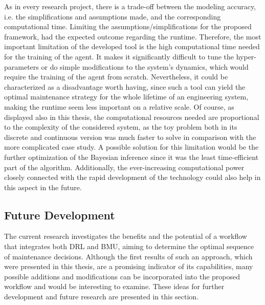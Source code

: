 As in every research project, there is a trade-off between the modeling accuracy, i.e. the simplifications and assumptions made, and the corresponding computational time. Limiting the assumptions/simplifications for the proposed framework, had the expected outcome regarding the runtime. Therefore, the most important limitation of the developed tool is the high computational time needed for the training of the agent. It makes it significantly difficult to tune the hyper-parameters or do simple modifications to the system's dynamics, which would require the training of the agent from scratch. Nevertheless, it could be characterized as a disadvantage worth having, since such a tool can yield the optimal maintenance strategy for the whole lifetime of an engineering system, making the runtime seem less important on a relative scale. Of course, as displayed also in this thesis, the computational resources needed are proportional to the complexity of the considered system, as the toy problem both in its discrete and continuous version was much faster to solve in comparison with the more complicated case study. A possible solution for this limitation would be the further optimization of the Bayesian inference since it was the least time-efficient part of the algorithm. Additionally, the ever-increasing computational power closely connected with the rapid development of the technology could also help in this aspect in the future.


\newpage


\subsection{Future Development} \label{futDev}

The current research investigates the benefits and the potential of a workflow that integrates both \gls{DRL} and \gls{BMU}, aiming to determine the optimal sequence of maintenance decisions. Although the first results of such an approach, which were presented in this thesis, are a promising indicator of its capabilities, many possible additions and modifications can be incorporated into the proposed workflow and would be interesting to examine. These ideas for further development and future research are presented in this section.\\

